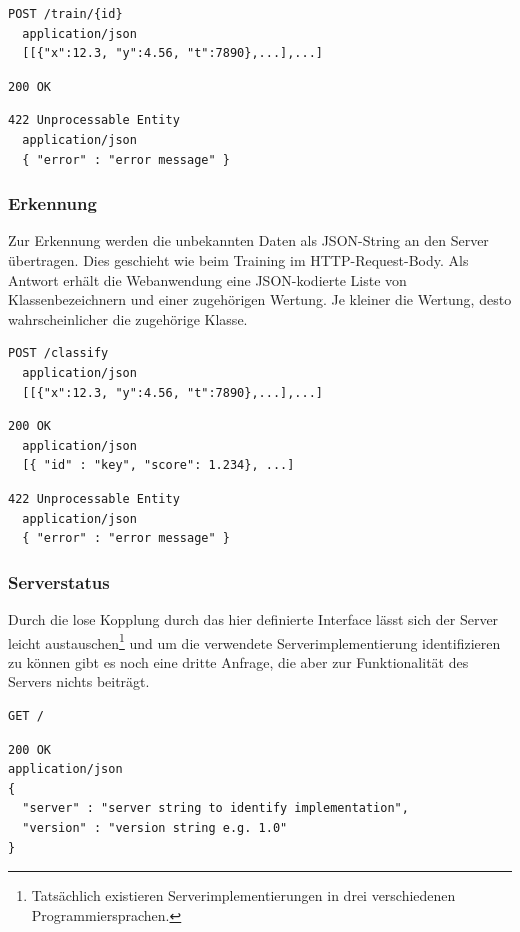 \begin{lstlisting}[caption={Anfrage}]
  POST /train/{id}
  application/json
  [[{"x":12.3, "y":4.56, "t":7890},...],...]
\end{lstlisting}
\begin{lstlisting}[caption={Antwort}]
  200 OK
\end{lstlisting}
\begin{lstlisting}[caption={Antwort im Fehlerfall}]
  422 Unprocessable Entity
  application/json
  { "error" : "error message" }
\end{lstlisting}

\subsubsection{Erkennung}

Zur Erkennung werden die unbekannten Daten als \ac{JSON}-String an den Server übertragen. Dies geschieht wie beim Training im \ac{HTTP}-Request-Body. Als Antwort erhält die Webanwendung eine \ac{JSON}-kodierte Liste von Klassenbezeichnern und einer zugehörigen Wertung. Je kleiner die Wertung, desto wahrscheinlicher die zugehörige Klasse.

\begin{lstlisting}[caption={Anfrage}]
  POST /classify
  application/json
  [[{"x":12.3, "y":4.56, "t":7890},...],...]
\end{lstlisting}
\begin{lstlisting}[caption={Antwort}]
  200 OK
  application/json
  [{ "id" : "key", "score": 1.234}, ...]
\end{lstlisting}
\begin{lstlisting}[caption={Antwort im Fehlerfall}]
  422 Unprocessable Entity
  application/json
  { "error" : "error message" }
\end{lstlisting}

\subsubsection{Serverstatus}

Durch die lose Kopplung durch das hier definierte Interface lässt sich der Server leicht austauschen\footnote{Tatsächlich existieren Serverimplementierungen in drei verschiedenen Programmiersprachen.} und um die verwendete Serverimplementierung identifizieren zu können gibt es noch eine dritte Anfrage, die aber zur Funktionalität des Servers nichts beiträgt.

\begin{lstlisting}[caption={Anfrage}]
GET /
\end{lstlisting}
\begin{lstlisting}[caption={Antwort}]
200 OK
application/json
{ 
  "server" : "server string to identify implementation",
  "version" : "version string e.g. 1.0"
}
\end{lstlisting}
  
